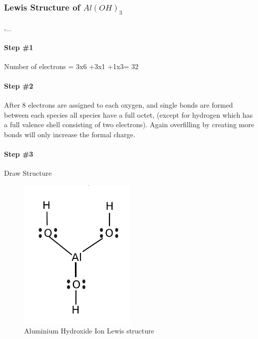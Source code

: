 \documentclass[]{article}
\let\oldparagraph\paragraph
\renewcommand{\paragraph}[1]{\oldparagraph{#1}\mbox{}}
\begin{document}
\hypertarget{lewis-structure-of-aloh_3}{%
\subsubsection{\texorpdfstring{Lewis Structure of
\(Al(OH)_3\)}{Lewis Structure of Al(OH)\_3}}\label{lewis-structure-of-aloh_3}}

,\_

\hypertarget{step-1-2}{%
\paragraph{Step \#1}\label{step-1-2}}

Number of electrons = 3x6 +3x1 +1x3= 32

\hypertarget{step-2-2}{%
\paragraph{Step \#2}\label{step-2-2}}

After 8 electrons are assigned to each oxygen, and single bonds are
formed between each species all species have a full octet, (except for
hydrogen which has a full valence shell consisting of two electrons).
Again overfilling by creating more bonds will only increase the formal
charge.

\hypertarget{step-3-2}{%
\paragraph{Step \#3}\label{step-3-2}}

Draw Structure

\begin{figure}
\centering
\includegraphics[width=0.5\textwidth,height=\textheight]{Images/AluminiumHydroxideLewisStructure.jpg}
\caption{Aluminium Hydroxide Ion Lewis structure}
\end{figure}
\end{document}
